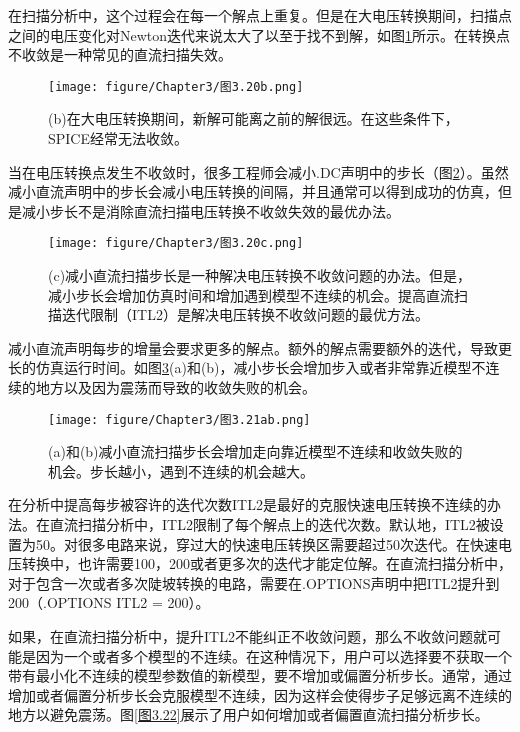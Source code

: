 在扫描分析中，这个过程会在每一个解点上重复。但是在大电压转换期间，扫描点之间的电压变化对Newton迭代来说太大了以至于找不到解，如图\ref{图3.20b}所示。在转换点不收敛是一种常见的直流扫描失效。
\begin{figure}[htbp]
\small
    \centering
    \texttt{[image: figure/Chapter3/图3.20b.png]}
    \caption{(b)在大电压转换期间，新解可能离之前的解很远。在这些条件下，SPICE经常无法收敛。}
    \label{图3.20b}
\end{figure}

当在电压转换点发生不收敛时，很多工程师会减小.DC声明中的步长（图\ref{图3.20c}）。虽然减小直流声明中的步长会减小电压转换的间隔，并且通常可以得到成功的仿真，但是减小步长不是消除直流扫描电压转换不收敛失效的最优办法。

\begin{figure}[htbp]
\small
    \centering
    \texttt{[image: figure/Chapter3/图3.20c.png]}
    \caption{(c)减小直流扫描步长是一种解决电压转换不收敛问题的办法。但是，减小步长会增加仿真时间和增加遇到模型不连续的机会。提高直流扫描迭代限制（ITL2）是解决电压转换不收敛问题的最优方法。}
    \label{图3.20c}
\end{figure}

减小直流声明每步的增量会要求更多的解点。额外的解点需要额外的迭代，导致更长的仿真运行时间。如图\ref{图3.21ab}(a)和(b)，减小步长会增加步入或者非常靠近模型不连续的地方以及因为震荡而导致的收敛失败的机会。

\begin{figure}[htbp]
\small
    \centering
    \texttt{[image: figure/Chapter3/图3.21ab.png]}
    \caption{(a)和(b)减小直流扫描步长会增加走向靠近模型不连续和收敛失败的机会。步长越小，遇到不连续的机会越大。}
    \label{图3.21ab}
\end{figure}

在分析中提高每步被容许的迭代次数ITL2是最好的克服快速电压转换不连续的办法。在直流扫描分析中，ITL2限制了每个解点上的迭代次数。默认地，ITL2被设置为50。对很多电路来说，穿过大的快速电压转换区需要超过50次迭代。在快速电压转换中，也许需要100，200或者更多次的迭代才能定位解。在直流扫描分析中，对于包含一次或者多次陡坡转换的电路，需要在.OPTIONS声明中把ITL2提升到200（.OPTIONS ITL2 = 200）。

如果，在直流扫描分析中，提升ITL2不能纠正不收敛问题，那么不收敛问题就可能是因为一个或者多个模型的不连续。在这种情况下，用户可以选择要不获取一个带有最小化不连续的模型参数值的新模型，要不增加或偏置分析步长。通常，通过增加或者偏置分析步长会克服模型不连续，因为这样会使得步子足够远离不连续的地方以避免震荡。图\ref{图3.22}展示了用户如何增加或者偏置直流扫描分析步长。

